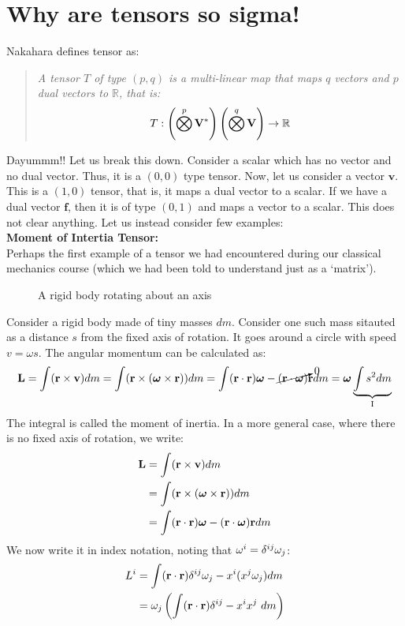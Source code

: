 \section{Why are tensors so sigma!}
Nakahara defines tensor as:
\begin{quote}
    \textit{A tensor $T$ of type $(p,q)$ is a multi-linear map that maps $q$ vectors and $p$ dual vectors to $\mathbb{R}$, that is:
    $$ T: \left( \bigotimes\limits^p \mathbf{V}^*  \right) \left( \bigotimes\limits^q \mathbf{V}  \right)\to \mathbb{R} $$}
\end{quote}
Dayummm!!  Let us break this down. Consider a scalar which has no vector and no dual vector. Thus, it is a $(0,0)$ type tensor. Now, let us consider a vector $\mathbf{v}$. This is a $(1,0)$ tensor, that is, it maps a dual vector to a scalar. If we have a dual vector $\mathbf{f}$, then it is of type $(0,1)$ and maps a vector to a scalar. This does not clear anything. Let us instead consider few examples:\\[0.3cm]
\textbf{Moment of Intertia Tensor:}\\[0.3cm]
Perhaps the first example of a tensor we had encountered during our classical mechanics course (which we had been told to understand just as a `matrix'). 
\begin{figure}[H]
    \centering
    
    \caption{A rigid body rotating about an axis}
\end{figure}
\noindent
Consider a rigid body made of tiny masses $dm$. Consider one such mass sitauted as a distance $s$ from the fixed axis of rotation. It goes around a circle with speed $v = \omega s$. The angular momentum can be calculated as:
$$\mathbf{L} = \int (\boldsymbol{\mathbf{r}}\times \boldsymbol{\mathbf{v}})dm = \int (\boldsymbol{\mathbf{r}}\times (\boldsymbol{\mathbf{\omega}}\times \boldsymbol{\mathbf{r}}))dm = \int (\boldsymbol{\mathbf{r}}\cdot \boldsymbol{\mathbf{r}})\boldsymbol{\mathbf{\omega}} -  \cancelto{0}{(\boldsymbol{\mathbf{r}}\cdot \boldsymbol{\mathbf{\omega}})}\boldsymbol{\mathbf{r}}dm =\boldsymbol{\mathbf{\omega}} \underbrace{\int s^2 dm}_{\text{I}} $$
The integral is called the moment of inertia. In a more general case, where there is no fixed axis of rotation, we write: 
\begin{align*}
    \mathbf{L} &= \int (\boldsymbol{\mathbf{r}}\times \boldsymbol{\mathbf{v}})dm \\
    &= \int (\boldsymbol{\mathbf{r}}\times (\boldsymbol{\mathbf{\omega}}\times \boldsymbol{\mathbf{r}}))dm \\
    &= \int (\boldsymbol{\mathbf{r}}\cdot \boldsymbol{\mathbf{r}})\boldsymbol{\mathbf{\omega}} -  {(\boldsymbol{\mathbf{r}}\cdot \boldsymbol{\mathbf{\omega}})}\boldsymbol{\mathbf{r}}dm
\end{align*}
We now write it in index notation, noting that $\omega^i = \tensor*{\delta}{^i^j}\omega_j$:
\begin{align*}
    L^i &= \int (\veb{r}\cdot \veb{r})\tensor*{\delta}{^i^j}\omega_j - x^i(x^j\omega_j)dm\\
    &= \omega_j \brac{\int (\veb{r}\cdot \veb{r})\tensor*{\delta}{^i^j} - x^ix^j\ dm} 
\end{align*}
